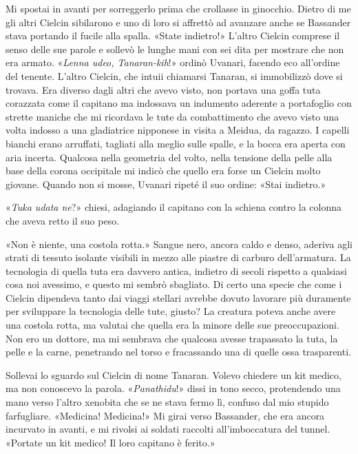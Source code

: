 Mi spostai in avanti per sorreggerlo prima che crollasse in ginocchio.
Dietro di me gli altri Cielcin sibilarono e uno di loro si affrettò ad
avanzare anche se Bassander stava portando il fucile alla spalla. «State
indietro!» L'altro Cielcin comprese il senso delle sue parole e sollevò
le lunghe mani con sei dita per mostrare che non era armato.
«\emph{Lenna udeo, Tanaran-kih}!» ordinò Uvanari, facendo eco all'ordine
del tenente. L'altro Cielcin, che intuii chiamarsi Tanaran, si
immobilizzò dove si trovava. Era diverso dagli altri che avevo visto,
non portava una goffa tuta corazzata come il capitano ma indossava un
indumento aderente a portafoglio con strette maniche che mi ricordava le
tute da combattimento che avevo visto una volta indosso a una
gladiatrice nipponese in visita a Meidua, da ragazzo. I capelli bianchi
erano arruffati, tagliati alla meglio sulle spalle, e la bocca era
aperta con aria incerta. Qualcosa nella geometria del volto, nella
tensione della pelle alla base della corona occipitale mi indicò che
quello era forse un Cielcin molto giovane. Quando non si mosse, Uvanari
ripeté il suo ordine: «Stai indietro.»

«\emph{Tuka udata ne}?» chiesi, adagiando il capitano con la schiena
contro la colonna che aveva retto il suo peso.

«Non è niente, una costola rotta.» Sangue nero, ancora caldo e denso,
aderiva agli strati di tessuto isolante visibili in mezzo alle piastre
di carburo dell'armatura. La tecnologia di quella tuta era davvero
antica, indietro di secoli rispetto a qualsiasi cosa noi avessimo, e
questo mi sembrò sbagliato. Di certo una specie che come i Cielcin
dipendeva tanto dai viaggi stellari avrebbe dovuto lavorare più
duramente per sviluppare la tecnologia delle tute, giusto? La creatura
poteva anche avere una costola rotta, ma valutai che quella era la
minore delle sue preoccupazioni. Non ero un dottore, ma mi sembrava che
qualcosa avesse trapassato la tuta, la pelle e la carne, penetrando nel
torso e fracassando una di quelle ossa trasparenti.

Sollevai lo sguardo sul Cielcin di nome Tanaran. Volevo chiedere un kit
medico, ma non conoscevo la parola. «\emph{Panathidu}!» dissi in tono
secco, protendendo una mano verso l'altro xenobita che se ne stava fermo
lì, confuso dal mio stupido farfugliare. «Medicina! Medicina!» Mi girai
verso Bassander, che era ancora incurvato in avanti, e mi rivolsi ai
soldati raccolti all'imboccatura del tunnel. «Portate un kit medico! Il
loro capitano è ferito.»

